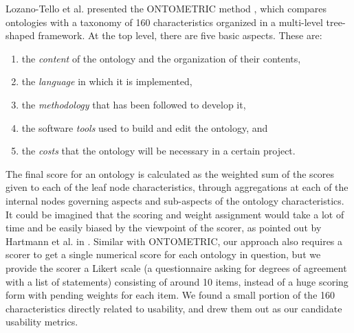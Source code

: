 Lozano-Tello et al. presented the ONTOMETRIC method \cite{lozano2003selection,lozano2004ontometric}, which compares ontologies with a taxonomy of 160 characteristics organized in a multi-level tree-shaped framework. At the top level, there are five basic aspects. These are: 
\begin{enumerate}
	\item the \emph{content} of the ontology and the
	organization of their contents, 
	\item the \emph{language}
	in which it is implemented, 
	\item the \emph{methodology}
	that has been followed to develop it,
	\item the software \emph{tools} used to build and edit
	the ontology, and 
	\item the \emph{costs} that the ontology
	will be necessary in a certain project.
\end{enumerate}
The final score for an ontology is calculated as the weighted sum of the scores given to each of the leaf node characteristics, through aggregations at each of the internal nodes governing aspects and sub-aspects of the ontology characteristics. It could be imagined that the scoring and weight assignment would take a lot of time and be easily biased by the viewpoint of the scorer, as pointed out by Hartmann et al. in \cite{hartmann2005d1}. Similar with ONTOMETRIC, our approach also requires a scorer to get a single numerical score for each ontology in question, but we provide the scorer a Likert scale (a questionnaire asking for degrees of agreement with a list of statements) consisting of around 10 items, instead of a huge scoring form with pending weights for each item. We found a small portion of the 160 characteristics directly related to usability, and drew them out as our candidate usability metrics.

